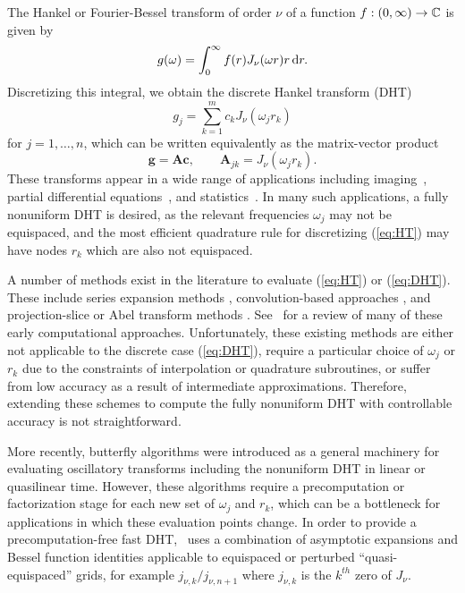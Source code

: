 The Hankel or Fourier-Bessel transform of order $\nu$ of a function $f : (0,
\infty) \to \mathbb{C}$ is given by
\begin{equation} \label{eq:HT}
    g(\omega) = \int_0^\infty f(r) J_\nu(\omega r) r \mathop{}\!\mathrm{d}{r}.
\end{equation}
Discretizing this integral, we obtain the discrete Hankel transform (DHT)
\begin{equation} \label{eq:DHT}
    g_j = \sum_{k=1}^m c_k J_\nu(\omega_j r_k)
\end{equation}
for $j=1, \dots, n$, which can be written equivalently as the matrix-vector
product
\begin{equation}
    \bm{g} = \bm{A}\bm{c}, \qquad \bm{A}_{jk} = J_\nu(\omega_j r_k).
\end{equation}
These transforms appear in a wide range of applications including
imaging~\citep{higgins1988hankel, zhao2013fourier}, partial differential
equations~\citep{bisseling1985fast,ali1999generalized}, and
statistics~\cite{lord1954a, genton2002nonparametric}. In many such applications,
a fully nonuniform DHT is desired, as the relevant frequencies $\omega_j$ may
not be equispaced, and the most efficient quadrature rule for discretizing
(\ref{eq:HT}) may have nodes $r_k$ which are also not equispaced.

A number of methods exist in the literature to evaluate (\ref{eq:HT}) or
(\ref{eq:DHT}). These include series expansion methods
\citep{lord1954b,brunol1977fourier,cavanagh1979numerical}, convolution-based
approaches \citep{siegman1977quasi, johansen1979fast, mook1983algorithm}, and
projection-slice or Abel transform methods \citep{oppenheim1980computation,
hansen1985fast, kapur1995algorithm}. See~\cite{cree1993algorithms} for a review
of many of these early computational approaches. Unfortunately, these existing methods
are either not applicable to the discrete case (\ref{eq:DHT}), require a
particular choice of $\omega_j$ or $r_k$ due to the constraints of interpolation
or quadrature subroutines, or suffer from low accuracy as a result of
intermediate approximations. Therefore, extending these schemes to compute the
fully nonuniform DHT with controllable accuracy is not straightforward. 

More recently, butterfly algorithms \citep{oneil2010algorithm, li2015butterfly,
pang2020interpolative} were introduced as a general machinery for evaluating
oscillatory transforms including the nonuniform DHT in linear or quasilinear
time. However, these algorithms require a precomputation or factorization stage
for each new set of $\omega_j$ and $r_k$, which can be a bottleneck for
applications in which these evaluation points change. In order to provide a
precomputation-free fast DHT,~\cite{townsend2015fast} uses a combination of
asymptotic expansions and Bessel function identities applicable to equispaced or
perturbed ``quasi-equispaced'' grids, for example $j_{\nu,k} / j_{\nu,n+1}$
where $j_{\nu,k}$ is the $k^{th}$ zero of $J_\nu$.

